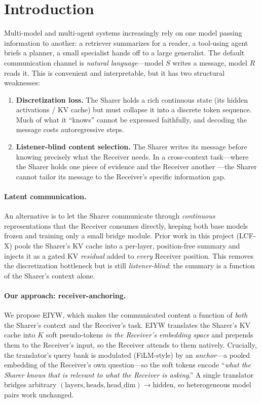 \documentclass[11pt]{article}
\newcommand{\method}{\textsc{EIYW}\xspace}      %
\newcommand{\lcfx}{\textsc{LCF-X}\xspace}        %
\newcommand{\sharer}{\textsf{Sharer}\xspace}
\newcommand{\receiver}{\textsf{Receiver}\xspace}
\begin{document}
\section{Introduction}
Multi-model and multi-agent systems increasingly rely on one model passing
information to another: a retriever summarizes for a reader, a tool-using agent
briefs a planner, a small specialist hands off to a large generalist. The
default communication channel is \emph{natural language}---model $S$ writes a
message, model $R$ reads it. This is convenient and interpretable, but it has
two structural weaknesses:
\begin{enumerate}
  \item \textbf{Discretization loss.} The \sharer holds a rich continuous state
  (its hidden activations / KV cache) but must collapse it into a discrete token
  sequence. Much of what it ``knows'' cannot be expressed faithfully, and
  decoding the message costs autoregressive steps.
  \item \textbf{Listener-blind content selection.} The \sharer writes its
  message before knowing precisely what the \receiver needs. In a cross-context
  task---where the \sharer holds one piece of evidence and the \receiver another
  ---the \sharer cannot tailor its message to the \receiver's specific
  information gap.
\end{enumerate}

\paragraph{Latent communication.} An alternative is to let the \sharer
communicate through \emph{continuous} representations that the \receiver
consumes directly, keeping both base models frozen and training only a small
bridge module. Prior work in this project (\lcfx) pools the \sharer's KV cache
into a per-layer, position-free summary and injects it as a gated KV
\emph{residual} added to \emph{every} \receiver position. This removes the
discretization bottleneck but is still \emph{listener-blind}: the summary is a
function of the \sharer's context alone.

\paragraph{Our approach: receiver-anchoring.} We propose \method, which makes
the communicated content a function of \emph{both} the \sharer's context and the
\receiver's task. \method translates the \sharer's KV cache into $K$ soft
pseudo-tokens \emph{in the \receiver's embedding space} and prepends them to the
\receiver's input, so the \receiver attends to them natively. Crucially, the
translator's query bank is modulated (FiLM-style) by an \emph{anchor}---a pooled
embedding of the \receiver's own question---so the soft tokens encode
``\emph{what the \sharer knows that is relevant to what the \receiver is
asking}.'' A single translator bridges arbitrary
$(\text{layers},\text{heads},\text{head\_dim})\rightarrow\text{hidden}$, so
heterogeneous model pairs work unchanged.
\end{document}
